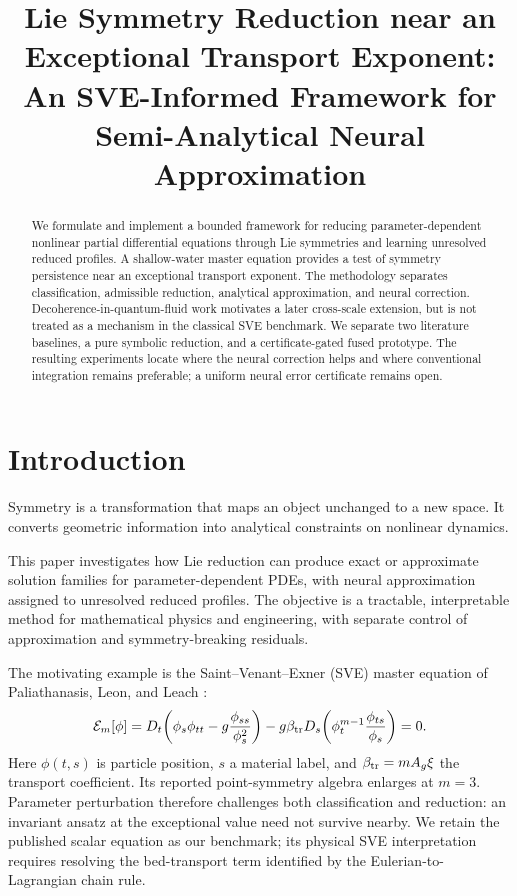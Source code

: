 \documentclass[11pt]{article}
\title{Lie Symmetry Reduction near an Exceptional Transport Exponent:\\
An SVE-Informed Framework for Semi-Analytical Neural Approximation}
\author{}
\date{}
\newcommand{\E}{\mathcal E}
\begin{document}
\maketitle
\begin{abstract}
We formulate and implement a bounded framework for reducing parameter-dependent nonlinear partial
differential equations through Lie symmetries and learning unresolved reduced
profiles. A shallow-water master equation provides a test of symmetry
persistence near an exceptional transport exponent. The methodology separates
classification, admissible reduction, analytical approximation, and neural
correction. Decoherence-in-quantum-fluid work motivates a later cross-scale
extension, but is not treated as a mechanism in the classical SVE benchmark.
We separate two literature baselines, a pure symbolic reduction, and a
certificate-gated fused prototype. The resulting experiments locate where the
neural correction helps and where conventional integration remains preferable;
a uniform neural error certificate remains open.
\end{abstract}

\section{Introduction}
Symmetry is a transformation that maps an object unchanged to a new space. It converts geometric information into analytical constraints on nonlinear
dynamics.

This paper investigates how Lie reduction can produce exact or
approximate solution families for parameter-dependent PDEs, with neural
approximation assigned to unresolved reduced profiles. The objective is a
tractable, interpretable method for mathematical physics and engineering,
with separate control of approximation and symmetry-breaking residuals.

The motivating example is the Saint--Venant--Exner (SVE) master equation of
Paliathanasis, Leon, and Leach \cite{ap}:
\begin{equation}
\E_m[\phi]=D_t\!\left(\phi_s\phi_{tt}-g\frac{\phi_{ss}}{\phi_s^2}\right)
-g\beta_{\rm tr} D_s\!\left(\phi_t^{m-1}\frac{\phi_{ts}}{\phi_s}\right)=0.
\label{eq:sve}
\end{equation}
Here $\phi(t,s)$ is particle position, $s$ a material label, and
$\beta_{\rm tr}=mA_g\xi$
the transport coefficient. Its reported point-symmetry algebra enlarges at
$m=3$. Parameter perturbation therefore challenges both classification and
reduction: an invariant ansatz at the exceptional value need not survive
nearby. We retain the published scalar equation as our benchmark; its physical
SVE interpretation requires resolving the bed-transport term identified by
the Eulerian-to-Lagrangian chain rule.
\end{document}
